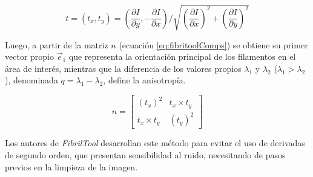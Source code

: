 \begin{equation}
\label{eq:fibritoolTensor}
t = (t_x,t_y) = (
\dfrac{\partial I}{\partial y}, -\frac{\partial I}{\partial x}) / \sqrt{  
(\frac{\partial I}{\partial x})^2 + 
(\frac{\partial I}{\partial y})^2 }
\end{equation}

Luego, a partir de la matriz $n$ (ecuaci\'on \ref{eq:fibritoolComps}) se obtiene su primer vector propio $\Vec{e}_1$ que representa la orientaci\'on principal de los filamentos en el \'area de inter\'es, mientras que la diferencia de los valores propios $\lambda_1$ y $\lambda_2$ ($\lambda_1 > \lambda_2$), denominada $q = \lambda_1 - \lambda_2$, define la anisotrop\'ia.


\begin{equation}
n =
\begin{bmatrix}
(t_x)^2 & t_x \times t_y \\
t_x \times t_y & (t_y)^2 
\end{bmatrix}
\label{eq:fibritoolComps}
\end{equation}

Los autores de {\it FibrilTool} desarrollan este m\'etodo para evitar el uso de derivadas de segundo orden, que presentan sensibilidad al ruido, necesitando de pasos previos en la limpieza de la imagen.

